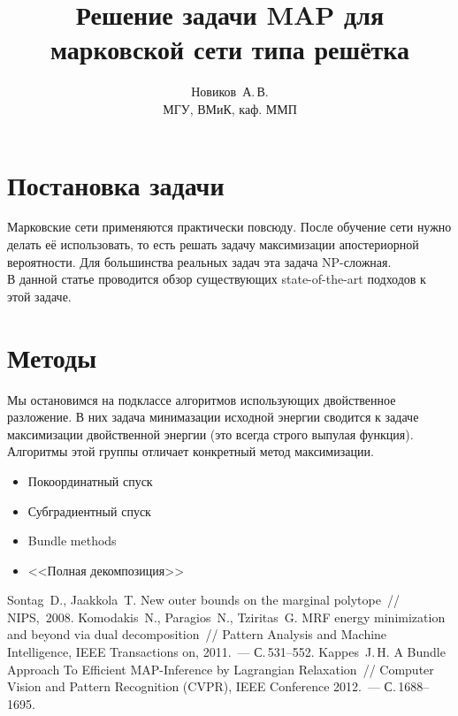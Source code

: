 \documentclass{article}
\title
    {Решение задачи MAP для марковской сети типа решётка}
\author
    {Новиков~А.\,В.\\
    МГУ, ВМиК, каф. ММП}
\begin{document}
\maketitle

\pagebreak

\section{Постановка задачи}
Марковские сети применяются практически повсюду.
После обучение сети нужно делать её использовать,
то есть решать задачу максимизации апостериорной вероятности.
Для большинства реальных задач эта задача NP-сложная.\\
В данной статье проводится обзор существующих
state-of-the-art подходов к этой задаче.
\pagebreak

\section{Методы}
Мы остановимся на подклассе алгоритмов использующих
двойственное разложение. В них задача минимазации
исходной энергии сводится к задаче максимизации
двойственной энергии (это всегда строго выпулая функция).
Алгоритмы этой группы отличает конкретный метод максимизации.
\begin{itemize}
\item Покоординатный спуск~\cite{Coordinatewise}
\item Субградиентный спуск~\cite{Subgradient}
\item Bundle methods~\cite{Bundle}
\item <<Полная декомпозиция>>
\end{itemize}
\pagebreak


\begin{thebibliography}{1}
    {Sontag~D.,  Jaakkola~T.}
    {New outer bounds on the marginal polytope}~//
    NIPS,~2008.
    {Komodakis~N., Paragios~N., Tziritas~G.}
    {MRF energy minimization and beyond via dual decomposition}~//
    Pattern Analysis and Machine Intelligence, IEEE Transactions on, 2011.~--- С.\,531--552.
    {Kappes~J.\,H.}
    {A Bundle Approach To Efficient MAP-Inference by Lagrangian Relaxation}~//
    Computer Vision and Pattern Recognition (CVPR), IEEE Conference 2012.~--- С.\,1688--1695.
\end{thebibliography}
\end{document}
